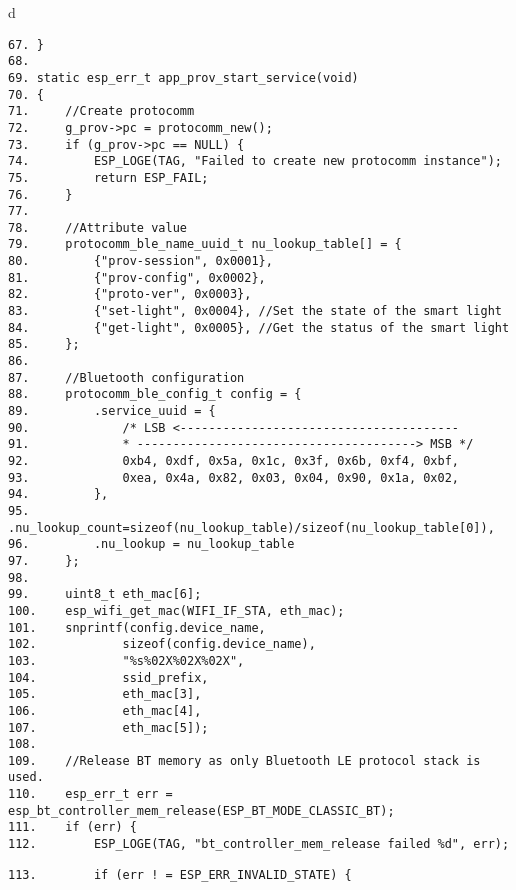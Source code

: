 \documentclass[a4paper,12pt]{book}
\begin{document}
\begin{codebloc}
\begin{tabular}{d}
\vspace{2pt}
\begin{verbatim}
67. }
68.	
69. static esp_err_t app_prov_start_service(void)
70. {
71.     //Create protocomm
72.     g_prov->pc = protocomm_new();
73.     if (g_prov->pc == NULL) {
74.         ESP_LOGE(TAG, "Failed to create new protocomm instance");
75.         return ESP_FAIL;
76.     }
77.	
78.     //Attribute value
79.     protocomm_ble_name_uuid_t nu_lookup_table[] = {
80.         {"prov-session", 0x0001},
81.         {"prov-config", 0x0002},
82.         {"proto-ver", 0x0003},
83.         {"set-light", 0x0004}, //Set the state of the smart light
84.         {"get-light", 0x0005}, //Get the status of the smart light
85.     };
86.	
87.     //Bluetooth configuration
88.     protocomm_ble_config_t config = {
89.         .service_uuid = {
90.             /* LSB <---------------------------------------
91.             * ---------------------------------------> MSB */
92.             0xb4, 0xdf, 0x5a, 0x1c, 0x3f, 0x6b, 0xf4, 0xbf,
93.             0xea, 0x4a, 0x82, 0x03, 0x04, 0x90, 0x1a, 0x02,
94.         },
95.         .nu_lookup_count=sizeof(nu_lookup_table)/sizeof(nu_lookup_table[0]),
96.         .nu_lookup = nu_lookup_table
97.     };
98.	
99.     uint8_t eth_mac[6];
100.    esp_wifi_get_mac(WIFI_IF_STA, eth_mac);
101.    snprintf(config.device_name,
102.            sizeof(config.device_name),
103.            "%s%02X%02X%02X",
104.            ssid_prefix,
105.            eth_mac[3],
106.            eth_mac[4],
107.            eth_mac[5]);
108.
109.    //Release BT memory as only Bluetooth LE protocol stack is used.
110.    esp_err_t err = esp_bt_controller_mem_release(ESP_BT_MODE_CLASSIC_BT);
111.    if (err) {
112.        ESP_LOGE(TAG, "bt_controller_mem_release failed %d", err);
\end{verbatim}
\verb|113.        if (err ! = ESP_ERR_INVALID_STATE) {|
\end{tabular}
\end{codebloc}
\end{document}
